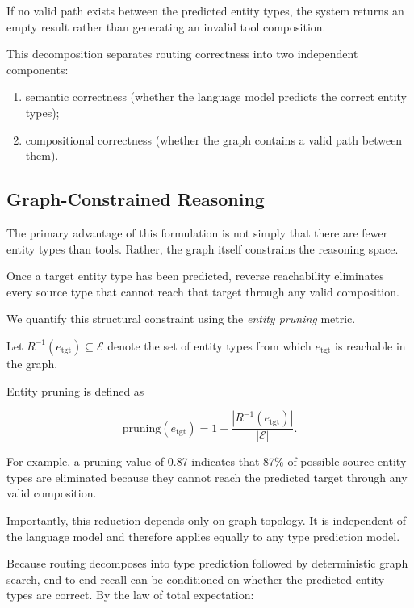 If no valid path exists between the predicted entity types, the system returns an empty result rather than generating an invalid tool composition.

This decomposition separates routing correctness into two independent components:

\begin{enumerate}
\item semantic correctness (whether the language model predicts the correct entity types);
\item compositional correctness (whether the graph contains a valid path between them).
\end{enumerate}

\subsection{Graph-Constrained Reasoning}
\label{sec:graph-constraint}

The primary advantage of this formulation is not simply that there are fewer entity types than tools.
Rather, the graph itself constrains the reasoning space.

Once a target entity type has been predicted, reverse reachability eliminates every source type that cannot reach that target through any valid composition.

We quantify this structural constraint using the \emph{entity pruning} metric.

Let
$R^{-1}(e_{\mathrm{tgt}})\subseteq\mathcal{E}$
denote the set of entity types from which
$e_{\mathrm{tgt}}$
is reachable in the graph.

Entity pruning is defined as

\begin{equation}
    \mathrm{pruning}(e_{\mathrm{tgt}})
    =
    1-
    \frac{
        |R^{-1}(e_{\mathrm{tgt}})|
    }{
        |\mathcal{E}|
    }.
    \label{eq:entity-pruning}
\end{equation}

For example, a pruning value of 0.87 indicates that 87\% of possible source entity types are eliminated because they cannot reach the predicted target through any valid composition.

Importantly, this reduction depends only on graph topology.
It is independent of the language model and therefore applies equally to any type prediction model.

Because routing decomposes into type prediction followed by deterministic graph search, end-to-end recall can be conditioned on whether the predicted entity types are correct.
By the law of total expectation:


